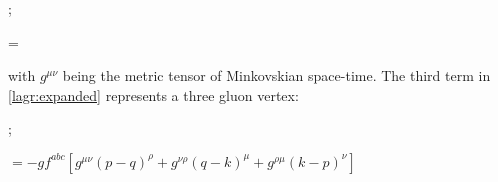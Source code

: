 \begin{minipage}{0.4\textwidth}
\begin{center}
    ;     
\end{center}
\end{minipage}
\begin{minipage}{0.58\textwidth}
        \beq \nonumber =  ~~~~~~~~~~~~~~~~~~~~~~~~~~~~~\eeq
\end{minipage} 
with $g^{\mu\nu}$ being the metric tensor of Minkovskian space-time. The third term in \cref{lagr:expanded} represents a three gluon vertex:
\begin{center}
\begin{minipage}{0.4\textwidth}
    \hspace{2cm};
\end{minipage}
\begin{minipage}{0.58\textwidth}
    $ = -gf^{abc}\left[g^{\mu\nu}(p-q)^\rho + g^{\nu\rho}(q-k)^\mu + g^{\rho\mu}(k-p)^\nu \right] $
\end{minipage}
\end{center}

